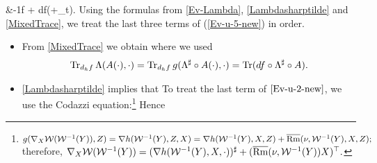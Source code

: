 {{    &-\fr 1f + df(+\del_{t}).}
Using the formulas from \cref{Ev-Lambda}, \cref{Lambdasharptilde} and \cref{MixedTrace}, we treat the last three terms of (\ref{Ev-u-5-new}) in order.
\begin{itemize}
  \item From \cref{MixedTrace} we obtain
where we used
\begin{align}
\operatorname{Tr}_{d_{h}f}\Lambda(A(\cdot),\cdot)=\operatorname{Tr}_{d_hf}g(\Lambda^{\sharp}\circ A(\cdot),\cdot)=\operatorname{Tr} (df\circ\Lambda^{\sharp}\circ A).
\end{align}
  \item \cref{Lambdasharptilde} implies that
To treat the last term of $\eqref{Ev-u-2-new}$, we use the Codazzi equation:\footnote{$g(\nabla_X \mathcal{W}(\mathcal{W}^{-1}(Y)),Z)=\nabla h(\mathcal{W}^{-1}(Y),Z,X)=\nabla h(\mathcal{W}^{-1}(Y),X,Z)+\overline{\mathrm{Rm}}(\nu,\mathcal{W}^{-1}(Y),X,Z);$ therefore,
$\nabla_X \mathcal{W}(\mathcal{W}^{-1}(Y))=(\nabla h(\mathcal{W}^{-1}(Y),X,\cdot))^{\sharp}+(\overline{\mathrm{Rm}}(\nu,\mathcal{W}^{-1}(Y))X)^{\top}.$}
Hence
\end{itemize}}

